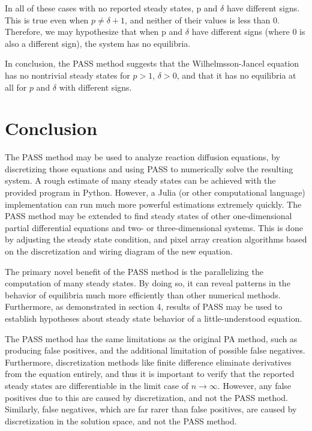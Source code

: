 \documentclass[11pt]{article}
\begin{document}
In all of these cases with no reported steady states, p and $\delta$ have different signs. This is true even when $p \ne \delta + 1$, and neither of their values is less than 0. Therefore, we may hypothesize that when p and $\delta$ have different signs (where 0 is also a different sign), the system has no equilibria. 

In conclusion, the PASS method suggests that the Wilhelmsson-Jancel equation has no nontrivial steady states for $p > 1$, $\delta > 0$, and that it has no equilibria at all for $p$ and $\delta$ with different signs.

\begin{comment}
\section{Analyzing the nonlocal Fisher equation}
Ask if this should be included for more variety, maybe legitimacy because relevant research is more recent? Thanks Stanford.
\end{comment}

\section{Conclusion}

The PASS method may be used to analyze reaction diffusion equations, by discretizing those equations and using PASS to numerically solve the resulting system. A rough estimate of many steady states can be achieved with the provided program in Python. However, a Julia (or other computational language) implementation can run much more powerful estimations extremely quickly. The PASS method may be extended to find steady states of other one-dimensional partial differential equations and two- or three-dimensional systems. This is done by adjusting the steady state condition, and pixel array creation algorithms based on the discretization and wiring diagram of the new equation.

The primary novel benefit of the PASS method is the parallelizing the computation of many steady states. By doing so, it can reveal patterns in the behavior of equilibria much more efficiently than other numerical methods. Furthermore, as demonstrated in section 4, results of PASS may be used to establish hypotheses about steady state behavior of a little-understood equation.

The PASS method has the same limitations as the original PA method, such as producing false positives, and the additional limitation of possible false negatives. Furthermore, discretization methods like finite difference eliminate derivatives from the equation entirely, and thus it is important to verify that the reported steady states are differentiable in the limit case of $n \rightarrow \infty$. However, any false positives due to this are caused by discretization, and not the PASS method. Similarly, false negatives, which are far rarer than false positives, are caused by discretization in the solution space, and not the PASS method.
\end{document}
